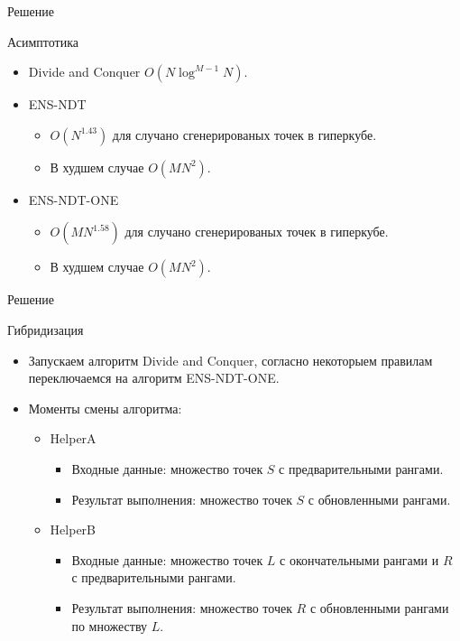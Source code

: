 \documentclass[table]{beamer}
\begin{document}
\begin{frame}{Решение}
\begin{block}{Асимптотика}
\begin{itemize}
\item Divide and Conquer $O(N \log^{M-1}N)$.
\item ENS-NDT
\begin{itemize}
\item $O(N^{1.43})$ для случано сгенерированых точек в гиперкубе.
\item В худшем случае $O(MN^{2})$.
\end{itemize}
\item ENS-NDT-ONE
\begin{itemize}
\item $O(MN^{1.58})$ для случано сгенерированых точек в гиперкубе.
\item В худшем случае $O(MN^{2})$.
\end{itemize}
\end{itemize}
\end{block}
\end{frame}

\begin{frame}{Решение}
\begin{block}{Гибридизация}
  \begin{itemize}
  \item Запускаем алгоритм Divide and Conquer, согласно некоторыем правилам переключаемся на алгоритм ENS-NDT-ONE.
  \item Моменты смены алгоритма:
    \begin{itemize}
    \item HelperA
      \begin{itemize}
      \item Входные данные: множество точек $S$ с предварительными рангами.
      \item Результат выполнения: множество точек $S$ с обновленными рангами.
      \end{itemize}
    \item HelperB  
      \begin{itemize}
      \item Входные данные: множество точек $L$ с окончательными рангами и $R$ с предварительными рангами.
      \item Результат выполнения: множество точек $R$ с обновленными рангами по множеству $L$.
      \end{itemize}
    \end{itemize}
  \end{itemize}
\end{block}
\end{frame}
\end{document}
